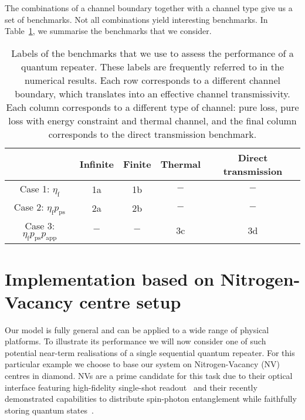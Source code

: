 \documentclass[aps,pra,reprint,superscriptaddress]{revtex4-1}
\begin{document}
The combinations of a channel boundary together with a channel type give us a set of benchmarks. Not all combinations yield interesting benchmarks. In Table~\ref{table:table1}, we summarise the benchmarks that we consider.\\

\begin{table}[H]
\begin{center}
\begin{tabular}{ c|c|c|c|c } 
 & Infinite & Finite & Thermal & Direct transmission \\ 
 \hline
Case 1: $\eta_{\textrm{f}}$ & 1a & 1b & $-$ & $-$\\ 
Case 2: $\eta_{\textrm{f}}p_{\textrm{ps}}$ & 2a & 2b & $-$ & $-$\\ 
Case 3: $\eta_{\textrm{f}}p_{\textrm{ps}}p_{\textrm{app}}$ & $-$ & $-$ & 3c & 3d \\ 
\end{tabular}
\caption{Labels of the benchmarks that we use to assess the performance of a quantum repeater. These labels are frequently referred to in the numerical results. Each row corresponds to a different channel boundary, which translates into an effective channel transmissivity. Each column corresponds to a different type of channel: pure loss, pure loss with energy constraint and thermal channel, and the final column corresponds to the direct transmission benchmark. }
\label{table:table1}
\end{center}
\vspace*{-10mm}
\end{table}


\section{Implementation based on Nitrogen-Vacancy centre setup}
\label{sec:NV}

Our model is fully general and can be applied to a wide range of physical platforms. To illustrate its performance we will now consider one of such potential near-term realisations of a single sequential quantum repeater. For this particular example we choose to base our system on Nitrogen-Vacancy (NV) centres in diamond. NVs are a prime candidate for this task due to their optical interface featuring high-fidelity single-shot readout~\cite{robledo2011high} and their recently demonstrated capabilities to distribute spin-photon entanglement while faithfully storing quantum states~\cite{kalb2017entanglement}.
\end{document}
